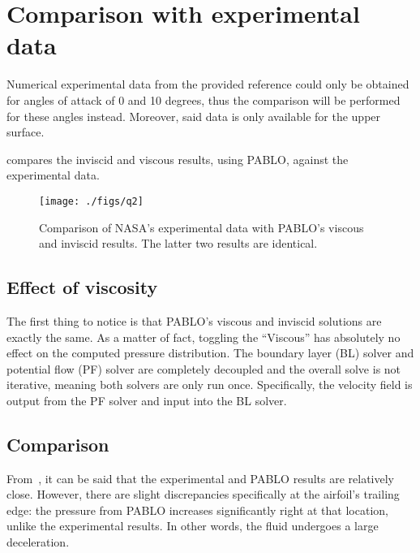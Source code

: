 \section{Comparison with experimental data}
Numerical experimental data from the provided reference could only be obtained for angles of
attack of 0 and 10 degrees, thus the comparison will be performed for these
angles instead. Moreover, said data is only available for the upper surface.

 compares the inviscid and viscous results, using PABLO, against
the experimental data.

\begin{figure}
    \centering
    \texttt{[image: ./figs/q2]}
    \caption{Comparison of NASA's experimental data with PABLO's viscous
        and inviscid results. The latter two results are identical.}\label{fig:q2}
\end{figure}

\subsection{Effect of viscosity}
The first thing to notice is that PABLO's viscous and inviscid solutions are exactly
the same. As a matter of fact, toggling the ``Viscous'' has absolutely no effect on
the computed pressure distribution. The boundary layer (BL) solver and potential flow (PF)
solver are completely decoupled and the overall solve is not iterative, meaning both
solvers are only run once. Specifically, the velocity field is output from the PF solver
and input into the BL solver.

\subsection{Comparison}
From~, it can be said that the experimental and PABLO results are relatively close.
However, there are slight discrepancies specifically at the airfoil's trailing edge: the pressure
from PABLO increases significantly right at that location, unlike the experimental results. In
other words, the fluid undergoes a large deceleration.
